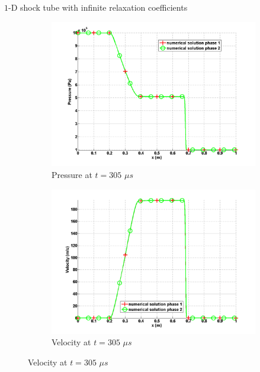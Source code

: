 \documentclass[xcolor=dvipsnames,10pt]{beamer}
\begin{document}
\begin{frame}{$1$-D shock tube with infinite relaxation coefficients}
\begin{figure}
        \begin{subfigure}[b]{0.37\textwidth}
                \centering
                \includegraphics[width=\textwidth]{../figures/SEM/relaxation_two_phases_pressure.png}
                \caption{Pressure at $t=305$ $\mu s$}
        \end{subfigure}%
        \begin{subfigure}[b]{0.37\textwidth}
                \centering
                \includegraphics[width=\textwidth]{../figures/SEM/relaxation_two_phases_velocity.png}
                \caption{Velocity at $t=305$ $\mu s$}
        \end{subfigure}%


\end{figure}
\end{frame}
\end{document}
